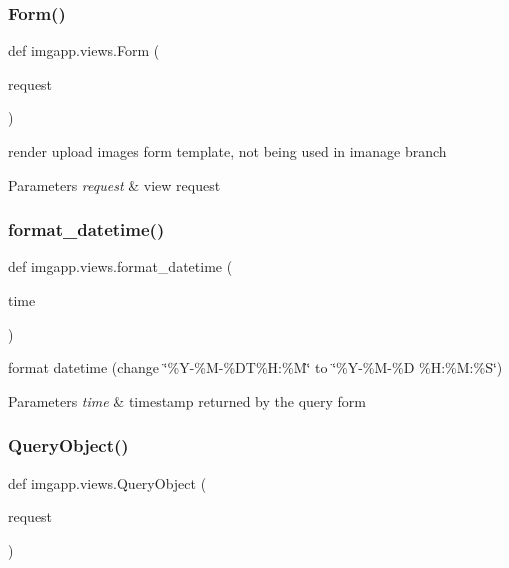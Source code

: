 \subsubsection{\texorpdfstring{Form()}{Form()}}
{\footnotesize\ttfamily def imgapp.\+views.\+Form (\begin{DoxyParamCaption}\item[{}]{request }\end{DoxyParamCaption})}



render upload images form template, not being used in imanage branch 


\begin{DoxyParams}{Parameters}
{\em request} & view request \\
\hline
\end{DoxyParams}
\mbox{\label{namespaceimgapp_1_1views_a0bad743f7a5c8bce58dbe6250dbc105f}} 
\subsubsection{\texorpdfstring{format\+\_\+datetime()}{format\_datetime()}}
{\footnotesize\ttfamily def imgapp.\+views.\+format\+\_\+datetime (\begin{DoxyParamCaption}\item[{}]{time }\end{DoxyParamCaption})}



format datetime (change \char`\"{}\%\+Y-\/\%\+M-\/\%\+D\+T\%\+H\+:\%\+M\char`\"{} to \char`\"{}\%\+Y-\/\%\+M-\/\%\+D \%\+H\+:\%\+M\+:\%\+S\char`\"{}) 


\begin{DoxyParams}{Parameters}
{\em time} & timestamp returned by the query form \\
\hline
\end{DoxyParams}
\mbox{\label{namespaceimgapp_1_1views_a42d42280064441dcaa48088fe3e43222}} 
\subsubsection{\texorpdfstring{Query\+Object()}{QueryObject()}}
{\footnotesize\ttfamily def imgapp.\+views.\+Query\+Object (\begin{DoxyParamCaption}\item[{}]{request }\end{DoxyParamCaption})}



